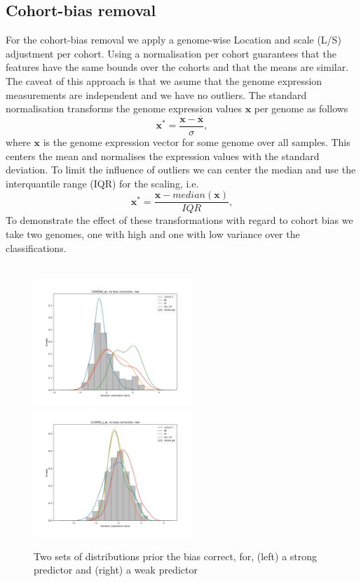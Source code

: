 \documentclass[a4paper,10pt]{article}
\begin{document}
\subsection{Cohort-bias removal}
%
For the cohort-bias removal we apply a genome-wise Location and scale (L/S) adjustment per cohort.
Using a normalisation per cohort guarantees that the features have the same bounds 
over the cohorts and that the means are similar. The caveat of this approach is that we asume 
that the genome expression measurements are independent and we have no outliers.
%
The standard normalisation transforms the genome expression values $\mathbf{x}$ per genome as follows
\begin{equation}
  \mathbf{x}^* = \frac{\mathbf{x} - \overline{\mathbf{x}}}{\sigma},
\end{equation}
%
where $\mathbf{x}$ is the genome expression vector for some genome over all samples. 
This centers the mean and normalises the  expression values with the standard deviation. 
To limit the influence of outliers we can center the median and use the interquantile range (IQR)
for the scaling, i.e.
%
\begin{equation}
  \mathbf{x}^* = \frac{\mathbf{x} - median\left({\mathbf{x}}\right)}{IQR},
\end{equation}
%
%
To demonstrate the effect of these transformations with regard to cohort bias we take two genomes, one with high and one with low variance
over the classifications. \\ \\
%
\begin{figure}[htp]
\centering
\includegraphics[width=6cm]{images/strong_genome_distribution_noCorrection_noNormalisation}
\includegraphics[width=6cm]{images/weak_genome_distribution_noCorrection_noNormalisation}
\caption{Two sets of distributions prior the bias correct, for, (left) a strong predictor and (right) a weak predictor}
\label{fig:expression_distribution_cohorts}
\end{figure}
\end{document}
